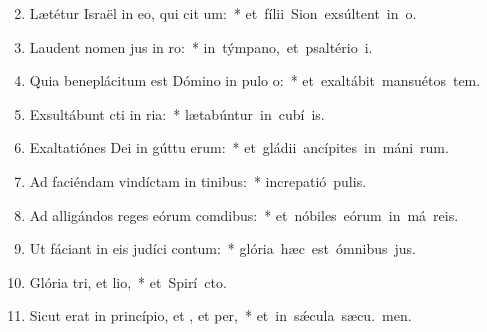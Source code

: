 \begin{flushleft}
\begin{enumerate}[leftmargin=*]
\setcounter{enumi}{1}


\item Lætétur Israël in eo, qui cit um:~* \mbox{et fílii Sion exsúltent in  o.}
\item Laudent nomen jus in ro:~* \mbox{in týmpano, et psaltério  i.}
\item Quia beneplácitum est Dómino in pulo o:~* \mbox{et exaltábit mansuétos  tem.}
\item Exsultábunt cti in ria:~* \mbox{lætabúntur in cubí is.}
\item Exaltatiónes Dei in gúttu erum:~* \mbox{et gládii ancípites in máni rum.}
\item Ad faciéndam vindíctam in tinibus:~* \mbox{increpatió  pulis.}
\item Ad alligándos reges eórum  comdibus:~* \mbox{et nóbiles eórum in má reis.}
\item Ut fáciant in eis judíci contum:~* \mbox{glória hæc est ómnibus  jus.}
\item Glória tri, et lio,~* \mbox{et Spirí cto.}
\item Sicut erat in princípio, et , et per,~* \mbox{et in s\'{\ae}cula sæcu. men.}

\end{enumerate}
\end{flushleft}

